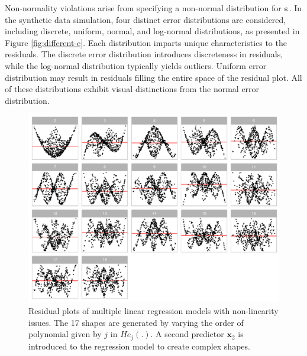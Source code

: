 \documentclass[]{interact}
\theoremstyle{plain}%
\theoremstyle{definition}
\theoremstyle{remark}
\begin{document}
Non-normality violations arise from specifying a non-normal distribution
for \(\boldsymbol{\varepsilon}\). In the synthetic data simulation, four
distinct error distributions are considered, including discrete,
uniform, normal, and log-normal distributions, as presented in Figure
\ref{fig:different-e}. Each distribution imparts unique characteristics
to the residuals. The discrete error distribution introduces
discreteness in residuals, while the log-normal distribution typically
yields outliers. Uniform error distribution may result in residuals
filling the entire space of the residual plot. All of these
distributions exhibit visual distinctions from the normal error
distribution.

\begin{figure}[!h]

{\centering \includegraphics[width=1\linewidth]{paper_files/figure-latex/different-j-x2-1} 

}

\caption{Residual plots of multiple linear regression models with non-linearity issues. The 17 shapes are generated by varying the order of polynomial given by $j$ in $He_j(.)$. A second predictor $\boldsymbol{x}_2$ is introduced to the regression model to create complex shapes.}\label{fig:different-j-x2}
\end{figure}
\end{document}

